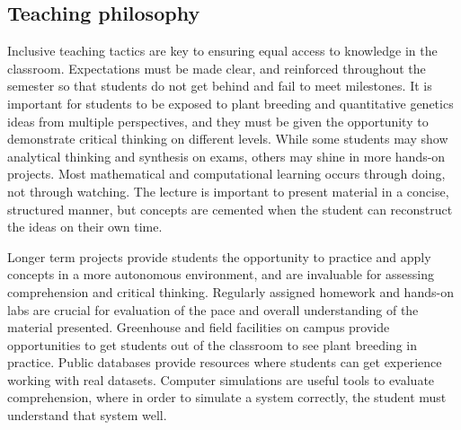\documentclass[11pt]{article}
\begin{document}
\subsection*{Teaching philosophy}

Inclusive teaching tactics are key to ensuring equal access to knowledge in the classroom. Expectations must be made clear, and reinforced throughout the semester so that students do not get behind and fail to meet milestones. It is important for students to be exposed to plant breeding and quantitative genetics ideas from multiple perspectives, and they must be given the opportunity to demonstrate critical thinking on different levels. While some students may show analytical thinking and synthesis on exams, others may shine in more hands-on projects. Most mathematical and computational learning occurs through doing, not through watching. The lecture is important to present material in a concise, structured manner, but concepts are cemented when the student can reconstruct the ideas on their own time.


Longer term projects provide students the opportunity to practice and apply concepts in a more autonomous environment, and are invaluable for assessing comprehension and critical thinking. Regularly assigned homework and hands-on labs are crucial for evaluation of the pace and overall understanding of the material presented. Greenhouse and field facilities on campus provide opportunities to get students out of the classroom to see plant breeding in practice. Public databases provide resources where students can get experience working with real datasets. Computer simulations are useful tools to evaluate comprehension, where in order to simulate a system correctly, the student must understand that system well.
\end{document}
